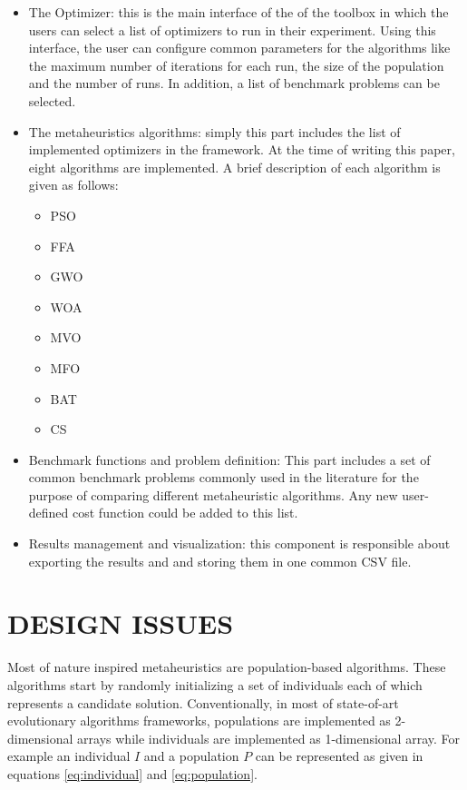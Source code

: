 \documentclass[a4paper,twoside]{article}
\begin{document}
\begin{itemize}
\item The Optimizer: this is the main interface of the of the toolbox in which the users can select a list of optimizers to run in their experiment. Using this interface, the user can configure common parameters for the algorithms like the maximum number of iterations for each run, the size of the population and the number of runs. In addition, a list of benchmark problems can be selected.

\item The metaheuristics algorithms: simply this part includes the list of implemented optimizers in the framework. At the time of writing this paper, eight algorithms are implemented. A brief description of each algorithm is given as follows:

\begin{itemize}
\item PSO
\item  FFA
\item GWO
\item WOA 
\item MVO
\item MFO
\item BAT
\item CS
\end{itemize}



\item Benchmark functions and problem definition: This part includes a set of common benchmark problems commonly used in the literature for the purpose of comparing different metaheuristic algorithms. Any new user-defined cost function could be added to this list.

\item Results management and visualization: this component is responsible about exporting the results and and storing them in one common CSV file. 
\end{itemize}


\section{\uppercase{Design issues}}

Most of nature inspired metaheuristics are population-based algorithms. These algorithms start by randomly initializing a set of individuals each of which represents a candidate solution. Conventionally, in most of state-of-art evolutionary algorithms frameworks, populations are implemented as 2-dimensional arrays while individuals are implemented as 1-dimensional array. For example an individual $I$ and a population $P$ can be represented as given in equations \ref{eq:individual} and \ref{eq:population}.
\end{document}
